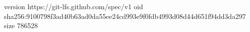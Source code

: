 version https://git-lfs.github.com/spec/v1
oid sha256:9100798f3ad40b63ad0da55ee24cd993e9f0fdb4993d08d44d651f94dd3da297
size 786528
